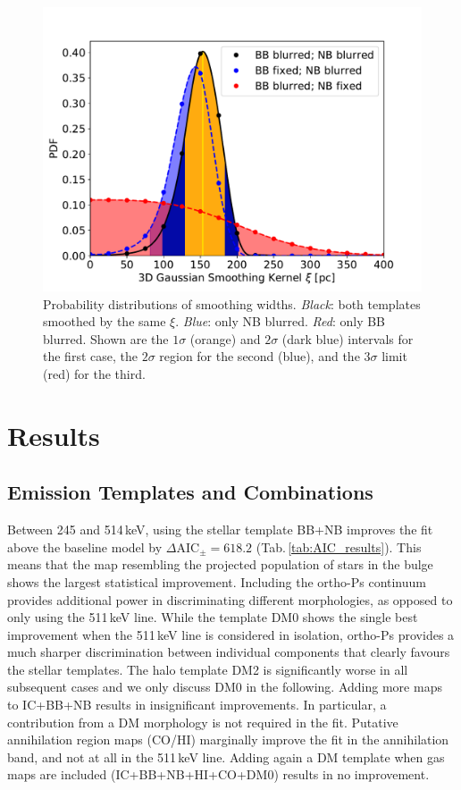 \documentclass[doublespace,draft,nopageskip]{VTthesis} %
\begin{document}
	
	\begin{figure}%
		\centering
		\includegraphics[width=0.8\columnwidth,trim=0.0in 0.15in 0.4in 0.7in, clip=True]{Figures/511keV/Blurred_bulges3D_PDF_comparison.pdf}
		\caption{Probability distributions of smoothing widths. \textit{Black}: both templates smoothed by the same $\xi$. \textit{Blue}: only NB blurred. \textit{Red}: only BB blurred. Shown are the $1\sigma$ (orange) and $2\sigma$ (dark blue) intervals for the first case, the $2\sigma$ region for the second (blue), and the $3\sigma$ limit (red) for the third.} 
		\label{fig:blur}
	\end{figure}
	
	
	\section{Results}\label{sec:results}
	\subsection{Emission Templates and Combinations}\label{sec:maps_as_they_are}
	Between 245 and 514\,keV, using the stellar template BB+NB improves the fit above the baseline model by $\Delta\mathrm{AIC}_{\pm} = 618.2$ (Tab.\,\ref{tab:AIC_results}). 
	This means that the map resembling the projected population of stars in the bulge shows the largest statistical improvement.
	Including the ortho-Ps continuum provides additional power in discriminating different morphologies, as opposed to only using the 511\,keV line.
	While the template DM0 shows the single best improvement when the 511\,keV line is considered in isolation, ortho-Ps provides a much sharper discrimination between individual components that clearly favours the stellar templates.
	The halo template DM2 is significantly worse in all subsequent cases and we only discuss DM0 in the following.
	Adding more maps to IC+BB+NB results in insignificant improvements.
	In particular, a contribution from a DM morphology is not required in the fit.
	Putative annihilation region maps (CO/HI) marginally improve the fit in the annihilation band, and not at all in the 511\,keV line.
	Adding again a DM template when gas maps are included (IC+BB+NB+HI+CO+DM0) results in no improvement.
	
\end{document}
